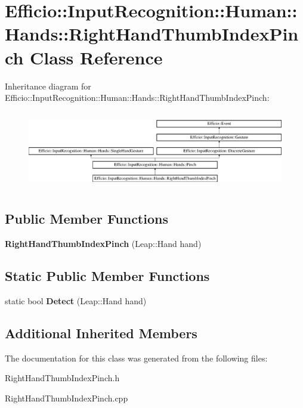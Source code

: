 \hypertarget{class_efficio_1_1_input_recognition_1_1_human_1_1_hands_1_1_right_hand_thumb_index_pinch}{}\section{Efficio\+:\+:Input\+Recognition\+:\+:Human\+:\+:Hands\+:\+:Right\+Hand\+Thumb\+Index\+Pinch Class Reference}
\label{class_efficio_1_1_input_recognition_1_1_human_1_1_hands_1_1_right_hand_thumb_index_pinch}
Inheritance diagram for Efficio\+:\+:Input\+Recognition\+:\+:Human\+:\+:Hands\+:\+:Right\+Hand\+Thumb\+Index\+Pinch\+:\begin{figure}[H]
\begin{center}
\leavevmode
\includegraphics[height=3.456790cm]{class_efficio_1_1_input_recognition_1_1_human_1_1_hands_1_1_right_hand_thumb_index_pinch}
\end{center}
\end{figure}
\subsection*{Public Member Functions}
\begin{DoxyCompactItemize}
\item 
{\bfseries Right\+Hand\+Thumb\+Index\+Pinch} (Leap\+::\+Hand hand)\hypertarget{class_efficio_1_1_input_recognition_1_1_human_1_1_hands_1_1_right_hand_thumb_index_pinch_ae11b82662f84ff774441a292f30af732}{}\label{class_efficio_1_1_input_recognition_1_1_human_1_1_hands_1_1_right_hand_thumb_index_pinch_ae11b82662f84ff774441a292f30af732}

\end{DoxyCompactItemize}
\subsection*{Static Public Member Functions}
\begin{DoxyCompactItemize}
\item 
static bool {\bfseries Detect} (Leap\+::\+Hand hand)\hypertarget{class_efficio_1_1_input_recognition_1_1_human_1_1_hands_1_1_right_hand_thumb_index_pinch_acadca2a597c6261848fcb5d1fee14f06}{}\label{class_efficio_1_1_input_recognition_1_1_human_1_1_hands_1_1_right_hand_thumb_index_pinch_acadca2a597c6261848fcb5d1fee14f06}

\end{DoxyCompactItemize}
\subsection*{Additional Inherited Members}


The documentation for this class was generated from the following files\+:\begin{DoxyCompactItemize}
\item 
Right\+Hand\+Thumb\+Index\+Pinch.\+h\item 
Right\+Hand\+Thumb\+Index\+Pinch.\+cpp\end{DoxyCompactItemize}
